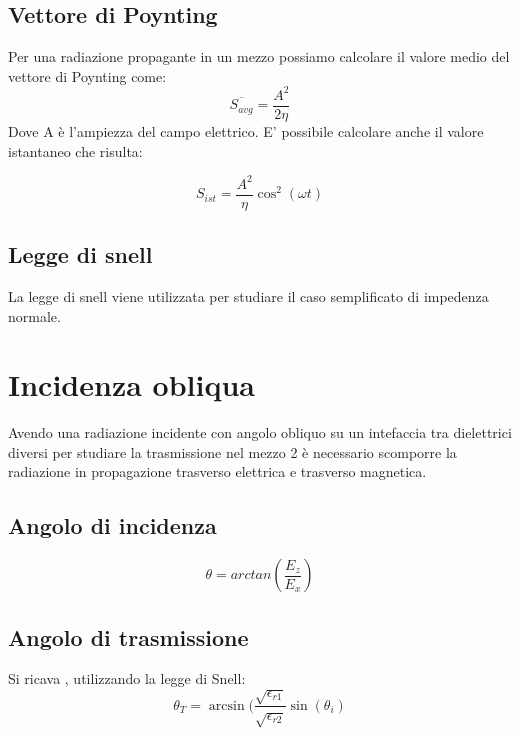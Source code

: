 \documentclass[10pt,a4paper]{report}
\begin{document}
	\section{Vettore di Poynting}
		Per una radiazione propagante in un mezzo possiamo calcolare il valore medio del vettore di Poynting come:
		\begin{equation}
		\overline{S_{avg}}=\frac{A^2}{2\eta}
		\end{equation}
		Dove A è l'ampiezza del campo elettrico.
		E' possibile calcolare anche il valore istantaneo che risulta:

		\begin{equation}
		S_{ist}=\frac{A^2}{\eta}\cos^2(\omega t)
		\end{equation}
	
	\section{Legge di snell}

	La legge di snell viene utilizzata per studiare il caso semplificato di impedenza normale.

\chapter{Incidenza obliqua}

	Avendo una radiazione incidente con angolo obliquo su un intefaccia tra dielettrici diversi per studiare la trasmissione nel mezzo 2 è necessario scomporre la radiazione in propagazione trasverso elettrica e trasverso magnetica.

	\section{Angolo di incidenza}

		\begin{equation}
		\theta=arctan(\frac{E_z}{E_x})
		\end{equation}



	\section{Angolo di trasmissione}
	Si ricava , utilizzando la legge di Snell:
	\begin{equation}
	\theta_T=\arcsin(\frac{\sqrt{\epsilon_{r1}}}{\sqrt{\epsilon_{r2}}}\sin(\theta_i)
	\label{eq:leggedisnell}
	\end{equation} 
	
\end{document}
